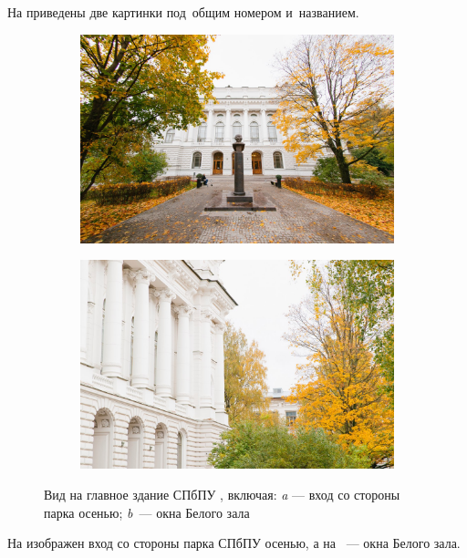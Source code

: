 На  приведены две картинки под~общим номером и~названием.


\begin{figure}[!htbp]
	\begin{subfigure}[t]{\dimexpr.5\linewidth-1.3em\relax} %
		\includegraphics[height=0.20\textheight,valign=t]{my_folder/images//spbpu_main_bld_entrance_autumn} %
	\end{subfigure}
	\begin{subfigure}[t]{\dimexpr.5\linewidth-1.3em\relax}%
		\includegraphics[height=0.20\textheight,valign=t]{my_folder/images//spbpu_main_bld_whitehall}%
	\end{subfigure}
\captionsetup{justification=centering} %
	\caption{Вид на главное здание СПбПУ \cite{spbpu-gallery}, включая: {\itshape a} --- вход со стороны парка осенью; {\itshape b}~--- окна Белого зала}\label{fig:spbpu_main_bld-two-photos} 
\end{figure}

На  изображен вход со стороны парка СПбПУ осенью, а на ~--- окна Белого зала.
